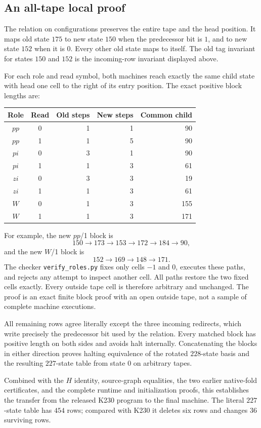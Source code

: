 \subsection{An all-tape local proof}

The relation on configurations preserves the entire tape and the head
position.  It maps old state $175$ to new state $150$ when the
predecessor bit is $1$, and to new state $152$ when it is $0$.
Every other old state maps to itself.  The old tag invariant for states
$150$ and $152$ is the incoming-row invariant displayed above.

For each role and read symbol, both machines reach exactly the same
child state with head one cell to the right of its entry position.
The exact positive block lengths are:
\begin{center}
\begin{tabular}{c c r r r}
Role & Read & Old steps & New steps & Common child\\
\hline
$pp$ & 0 & 1 & 1 & 90\\
$pp$ & 1 & 1 & 5 & 90\\
$pi$ & 0 & 3 & 1 & 90\\
$pi$ & 1 & 1 & 3 & 61\\
$zi$ & 0 & 3 & 3 & 19\\
$zi$ & 1 & 1 & 3 & 61\\
$W$  & 0 & 1 & 3 & 155\\
$W$  & 1 & 1 & 3 & 171
\end{tabular}
\end{center}

For example, the new $pp$/1 block is
\[
150\longrightarrow173\longrightarrow153\longrightarrow172
\longrightarrow184\longrightarrow90,
\]
and the new $W$/1 block is
\[
152\longrightarrow169\longrightarrow148\longrightarrow171.
\]
The checker \texttt{verify\_roles.py} fixes only cells $-1$ and $0$,
executes these paths, and rejects any attempt to inspect another cell.
All paths restore the two fixed cells exactly.  Every outside tape cell
is therefore arbitrary and unchanged.  The proof is an exact finite
block proof with an open outside tape, not a sample of complete machine
executions.

All remaining rows agree literally except the three incoming redirects,
which write precisely the predecessor bit used by the relation.
Every matched block has positive length on both sides and avoids halt
internally.  Concatenating the blocks in either direction proves
halting equivalence of the rotated $228$-state basis and the resulting
$227$-state table from state $0$ on arbitrary tapes.

Combined with the $H$ identity, source-graph equalities, the two earlier
native-fold certificates, and the complete runtime and initialization
proofs, this establishes the transfer from the released K230 program to
the final machine.  The literal $227$-state table has $454$ rows; compared
with K230 it deletes six rows and changes $36$ surviving rows.
